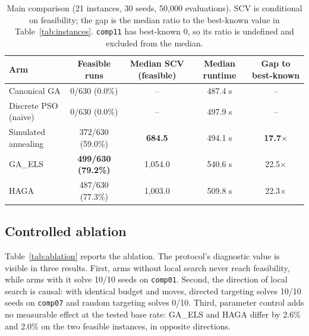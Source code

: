 \documentclass[journal]{IEEEtran}
\newcommand{\code}[1]{\texttt{#1}}
\begin{document}
\begin{table}[!t]
\caption{Main comparison (21 instances, 30 seeds, 50{,}000 evaluations). SCV is conditional on feasibility; the gap is the median ratio to the best-known value in Table~\ref{tab:instances}. \code{comp11} has best-known $0$, so its ratio is undefined and excluded from the median.}
\label{tab:main}
\centering
\small
\begin{tabular}{l c c c c}
\toprule
Arm & Feasible runs & Median SCV (feasible) & Median runtime & Gap to best-known \\
\midrule
Canonical GA          & 0/630 (0.0\%) & -- & 487.4 s & -- \\
Discrete PSO (naive)  & 0/630 (0.0\%) & -- & 497.9 s & -- \\
Simulated annealing   & 372/630 (59.0\%) & \textbf{684.5} & 494.1 s & \textbf{17.7}$\times$ \\
GA\_ELS               & \textbf{499/630 (79.2\%)} & 1{,}054.0 & 540.6 s & 22.5$\times$ \\
HAGA                  & 487/630 (77.3\%) & 1{,}003.0 & 509.8 s & 22.3$\times$ \\
\bottomrule
\end{tabular}
\end{table}

\subsection{Controlled ablation}
Table~\ref{tab:ablation} reports the ablation. The protocol's diagnostic value is visible in three results. First, arms without local search never reach feasibility, while arms with it solve 10/10 seeds on \code{comp01}. Second, the direction of local search is causal: with identical budget and moves, directed targeting solves 10/10 seeds on \code{comp07} and random targeting solves 0/10. Third, parameter control adds no measurable effect at the tested base rate: GA\_ELS and HAGA differ by 2.6\% and 2.0\% on the two feasible instances, in opposite directions.
\end{document}
